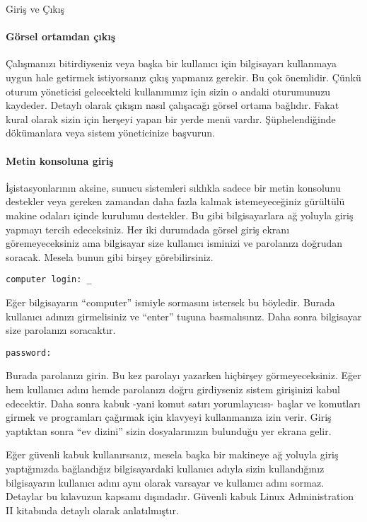 \begin{section}{Giriş ve Çıkış}
\paragraph{Görsel ortamdan çıkış}{Çalışmanızı bitirdiyseniz veya başka bir kullanıcı için bilgisayarı kullanmaya uygun hale getirmek istiyorsanız çıkış yapmanız gerekir. Bu çok önemlidir. Çünkü oturum yöneticisi gelecekteki kullanımınız için sizin o andaki oturumunuzu kaydeder. Detaylı olarak çıkışın nasıl çalışacağı görsel  ortama bağlıdır. Fakat kural olarak sizin için herşeyi yapan bir yerde menü vardır. Şüphelendiğinde dökümanlara veya sistem yöneticinize başvurun.}

\paragraph{Metin konsoluna giriş}{İşistasyonlarının aksine, sunucu sistemleri sıklıkla sadece bir metin konsolunu destekler veya gereken zamandan daha fazla kalmak istemeyeceğiniz gürültülü makine odaları içinde kurulumu destekler. Bu gibi bilgisayarlara ağ yoluyla giriş yapmayı tercih edeceksiniz. Her iki durumdada görsel giriş ekranı göremeyeceksiniz ama bilgisayar size kullanıcı isminizi ve parolanızı doğrudan soracak. Mesela bunun gibi birşey görebilirsiniz.}

\begin{verbatim}
computer login: _
\end{verbatim}

Eğer bilgisayarın “computer” ismiyle sormasını istersek bu böyledir. Burada kullanıcı adınızı girmelisiniz ve “enter” tuşuna basmalısınız. Daha sonra bilgisayar size parolanızı soracaktır. 

\begin{verbatim}
password:
\end{verbatim}

Burada parolanızı girin. Bu kez parolayı yazarken hiçbirşey görmeyeceksiniz. Eğer hem kullanıcı adını hemde parolanızı doğru girdiyseniz sistem girişinizi kabul edecektir. Daha sonra kabuk -yani komut satırı yorumlayıcısı- başlar ve komutları girmek ve programları çağırmak için klavyeyi kullanmanıza izin verir. Giriş yaptıktan sonra “ev dizini” sizin dosyalarınızın bulunduğu yer ekrana gelir.

Eğer güvenli kabuk kullanırsanız, mesela başka bir makineye ağ yoluyla giriş yaptığınızda bağlandığız bilgisayardaki kullanıcı adıyla sizin kullandığınız bilgisayarın kullanıcı adını aynı olarak varsayar ve kullanıcı adını sormaz. Detaylar bu kılavuzun kapsamı dışındadır. Güvenli kabuk Linux Administration II kitabında detaylı olarak anlatılmıştır.


\end{section}
